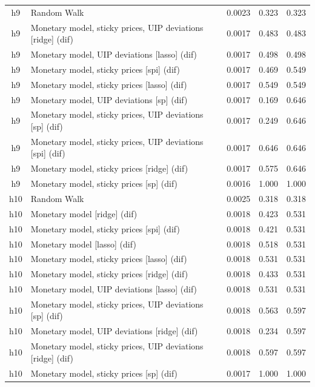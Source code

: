 \begin{ThreePartTable}
\begin{longtable}[t]{cp{5.5cm}ccc}
\addlinespace
h9 & \raggedright Random Walk & 0.0023 & 0.323 & 0.323\\
h9 & \raggedright Monetary model, sticky prices, UIP deviations [ridge] (dif) & 0.0017 & 0.483 & 0.483\\
h9 & \raggedright Monetary model, UIP deviations [lasso] (dif) & 0.0017 & 0.498 & 0.498\\
h9 & \raggedright Monetary model, sticky prices [spi] (dif) & 0.0017 & 0.469 & 0.549\\
h9 & \raggedright Monetary model, sticky prices [lasso] (dif) & 0.0017 & 0.549 & 0.549\\
h9 & \raggedright Monetary model, UIP deviations [sp] (dif) & 0.0017 & 0.169 & 0.646\\
h9 & \raggedright Monetary model, sticky prices, UIP deviations [sp] (dif) & 0.0017 & 0.249 & 0.646\\
h9 & \raggedright Monetary model, sticky prices, UIP deviations [spi] (dif) & 0.0017 & 0.646 & 0.646\\
h9 & \raggedright Monetary model, sticky prices [ridge] (dif) & 0.0017 & 0.575 & 0.646\\
h9 & \raggedright Monetary model, sticky prices [sp] (dif) & 0.0016 & 1.000 & 1.000\\
\addlinespace
h10 & \raggedright Random Walk & 0.0025 & 0.318 & 0.318\\
h10 & \raggedright Monetary model [ridge] (dif) & 0.0018 & 0.423 & 0.531\\
h10 & \raggedright Monetary model, sticky prices [spi] (dif) & 0.0018 & 0.421 & 0.531\\
h10 & \raggedright Monetary model [lasso] (dif) & 0.0018 & 0.518 & 0.531\\
h10 & \raggedright Monetary model, sticky prices [lasso] (dif) & 0.0018 & 0.531 & 0.531\\
h10 & \raggedright Monetary model, sticky prices [ridge] (dif) & 0.0018 & 0.433 & 0.531\\
h10 & \raggedright Monetary model, UIP deviations [lasso] (dif) & 0.0018 & 0.531 & 0.531\\
h10 & \raggedright Monetary model, sticky prices, UIP deviations [sp] (dif) & 0.0018 & 0.563 & 0.597\\
h10 & \raggedright Monetary model, UIP deviations [ridge] (dif) & 0.0018 & 0.234 & 0.597\\
h10 & \raggedright Monetary model, sticky prices, UIP deviations [ridge] (dif) & 0.0018 & 0.597 & 0.597\\
h10 & \raggedright Monetary model, sticky prices [sp] (dif) & 0.0017 & 1.000 & 1.000\\

\end{longtable}
\end{ThreePartTable}
